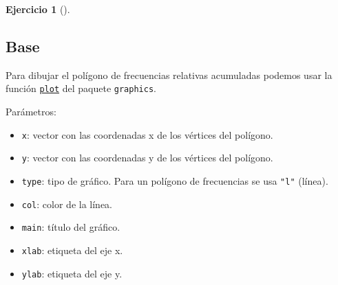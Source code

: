 \documentclass[
  spanish,
  a4paper,
]{scrreport}
\providecommand{\tightlist}{%
  \setlength{\itemsep}{0pt}\setlength{\parskip}{0pt}}
\theoremstyle{definition}
\newtheorem{exercise}{Ejercicio}[chapter]
\theoremstyle{remark}
\begin{document}
\begin{exercise}[]
\begin{enumerate}
  \begin{tcolorbox}[enhanced jigsaw, colback=white, coltitle=black, toprule=.15mm, rightrule=.15mm, opacitybacktitle=0.6, opacityback=0, bottomtitle=1mm, toptitle=1mm, titlerule=0mm, breakable, leftrule=.75mm, title=\textcolor{quarto-callout-tip-color}{\faLightbulb}\hspace{0.5em}{Solución}, arc=.35mm, left=2mm, bottomrule=.15mm, colframe=quarto-callout-tip-color-frame, colbacktitle=quarto-callout-tip-color!10!white]

  \section{Base}

  Para dibujar el polígono de frecuencias relativas acumuladas podemos
  usar la función
  \href{https://www.rdocumentation.org/packages/graphics/versions/3.6.2/topics/plot}{\texttt{plot}}
  del paquete \texttt{graphics}.

  Parámetros:

  \begin{itemize}
  \tightlist
  \item
    \texttt{x}: vector con las coordenadas x de los vértices del
    polígono.
  \item
    \texttt{y}: vector con las coordenadas y de los vértices del
    polígono.
  \item
    \texttt{type}: tipo de gráfico. Para un polígono de frecuencias se
    usa \texttt{"l"} (línea).
  \item
    \texttt{col}: color de la línea.
  \item
    \texttt{main}: título del gráfico.
  \item
    \texttt{xlab}: etiqueta del eje x.
  \item
    \texttt{ylab}: etiqueta del eje y.
  \end{itemize}


\end{tcolorbox}
\end{enumerate}
\end{exercise}
\end{document}
